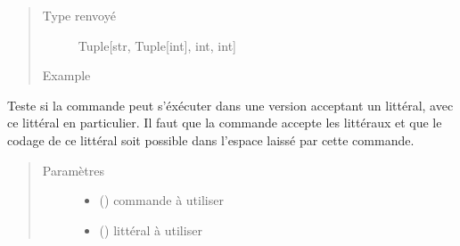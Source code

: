 \documentclass[letterpaper,10pt,french]{sphinxmanual}
\begin{document}
\begin{fulllineitems}
\begin{fulllineitems}
\begin{quote}
\begin{description}
\item[{Type renvoyé}] \leavevmode
Tuple{[}str, Tuple{[}int{]}, int, int{]}

\item[{Example}] \leavevmode
\begin{sphinxVerbatim}[commandchars=\\\{\}]
\end{sphinxVerbatim}

\end{description}\end{quote}

\end{fulllineitems}


\begin{fulllineitems}
\label{\detokenize{processorengine:processorengine.ProcessorEngine.litteralOperatorAvailable}}
Teste si la commande peut s’éxécuter dans une version acceptant un littéral, avec ce littéral en particulier. Il faut que la commande accepte les littéraux et que le codage de ce littéral soit possible dans l’espace laissé par cette commande.
\begin{quote}\begin{description}
\item[{Paramètres}] \leavevmode\begin{itemize}
\item {} 
 () \textendash{} commande à utiliser

\item {} 
 ({\hyperref[\detokenize{litteral:litteral.Litteral}]{}}) \textendash{} littéral à utiliser

\end{itemize}


\end{description}
\end{quote}
\end{fulllineitems}
\end{fulllineitems}
\end{document}
